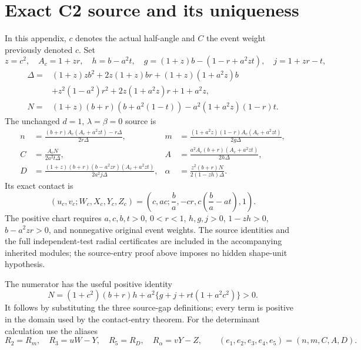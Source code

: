 \section{Exact C2 source and its uniqueness}\label{app:c2-source}
In this appendix, $c$ denotes the actual half-angle and
$C$ the event weight previously denoted $c$. Set
\[
 z=c^2,\quad A_c=1+zr,\quad
 h=b-a^2t,\quad g=(1+z)b-(1-r+a^2zt),\quad j=1+zr-t,
\]
\begin{align*}
\Delta={}&(1+z)zb^2+2z(1+z)br+(1+z)(1+a^2z)b\\
 &+z^2(1-a^2)r^2+2z(1+a^2z)r+1+a^2z,\\
N={}&(1+z)(b+r)(b+a^2(1-t))-a^2(1+a^2z)(1-r)t.
\end{align*}
The unchanged $d=1$, $\lambda=\beta=0$ source is
\begin{align*}
n&=\frac{(b+r)A_c(A_c+a^2zt)-r\Delta}{2r\Delta},&
m&=\frac{(1+a^2z)(1-r)A_c(A_c+a^2zt)}{2g\Delta},\\
C&=\frac{A_cN}{2a^2t\Delta},&
A&=\frac{a^2A_c(b+r)(A_c+a^2zt)}{2h\Delta},\\
D&=\frac{(1+z)(b+r)(b-a^2zr)(A_c+a^2zt)}{2a^2j\Delta},&
\alpha&=\frac{z^2(b+r)N}{2(1-zh)\Delta}.
\end{align*}
Its exact contact is
\[
 (u_c,v_c;W_c,X_c,Y_c,Z_c)
   =\left(c,ac;\frac ba,-cr,c\left(\frac ba-at\right),1\right).
\]
The positive chart requires $a,c,b,t>0$, $0<r<1$, $h,g,j>0$,
$1-zh>0$, $b-a^2zr>0$, and nonnegative original event weights.
The source identities and the full independent-test radial certificates
are included in the accompanying inherited modules; the source-entry
proof above imposes no hidden shape-unit hypothesis.


The numerator has the useful positive identity
\[
N=(1+c^2)(b+r)h+a^2\{g+j+rt(1+a^2c^2)\}>0.
\]
It follows by substituting the three source-gap definitions; every term
is positive in the domain used by the contact-entry theorem.
For the determinant calculation use the aliases
\[
 R_2=R_m,\quad R_3=uW-Y,\quad R_5=R_D,\quad R_\alpha=vY-Z,
 \qquad(e_1,e_2,e_3,e_4,e_5)=(n,m,C,A,D).
\]

